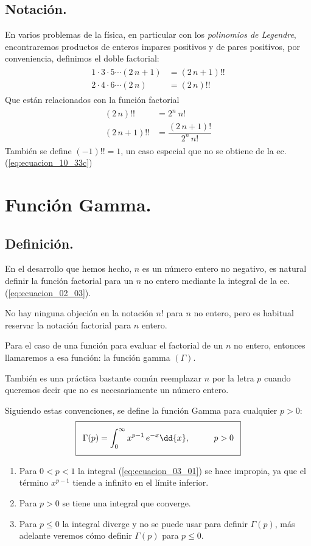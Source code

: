 \subsection{Notación.}
En varios problemas de la física, en particular con los \emph{polinomios de Legendre}, encontraremos productos de enteros impares positivos y de pares positivos, por conveniencia, definimos el doble factorial:
\begin{align}
\begin{aligned}
1 \cdot 3 \cdot 5 \cdots (2 \, n+1) &= (2 \, n+1) !! \\
2 \cdot 4 \cdot 6 \cdots (2 \, n) &= (2 \, n) !!
\end{aligned}
\label{eq:ecuacion_10_33b}
\end{align}
Que están relacionados con la función factorial
\begin{align}
\begin{aligned}
(2 \, n)!! &=  2^{n} \: n! \\[1em]
(2 \, n+1)!! &= \dfrac{(2 \, n+1)!}{2^{n} \, n!}
\end{aligned}
\label{eq:ecuacion_10_33c}
\end{align}
También se define $(-1)!! = 1$, un caso especial que no se obtiene de la ec. (\ref{eq:ecuacion_10_33c})
\section{Función Gamma.}
\subsection{Definición.}
En el desarrollo que hemos hecho, $n$ es un número entero no negativo, es natural definir la función factorial para un $n$ no entero mediante la integral de la ec.(\ref{eq:ecuacion_02_03}).
\par
No hay ninguna objeción en la notación $n!$ para $n$ no entero, pero es habitual reservar la notación factorial para $n$ entero.
\par
Para el caso de una función para evaluar el factorial de un $n$ no entero, entonces llamaremos a esa función: la función gamma $(\Gamma)$.
\par
También es una práctica bastante común reemplazar $n$ por la letra $p$ cuando queremos decir que no es necesariamente un número entero.
\par
Siguiendo estas convenciones, se define la función Gamma para cualquier $p > 0$:
\begin{align}\addtolength{\fboxsep}{5pt}\boxed{
\Gamma (p) = \int_{0}^{\infty} x^{p-1} \, e^{-x} \dd{x}, \hspace{1cm} p > 0}
\label{eq:ecuacion_03_01}
\end{align}
\begin{enumerate}
\item Para $0 < p < 1$ la integral (\ref{eq:ecuacion_03_01}) se hace impropia, ya que el término $x^{p-1}$ tiende a infinito en el límite inferior.
\item Para $p > 0$ se tiene una integral que converge.
\item Para $p \leq 0$ la integral diverge y no se puede usar para definir $\Gamma (p)$, más adelante veremos cómo definir  $\Gamma (p)$ para $p \leq 0$.
\end{enumerate}
